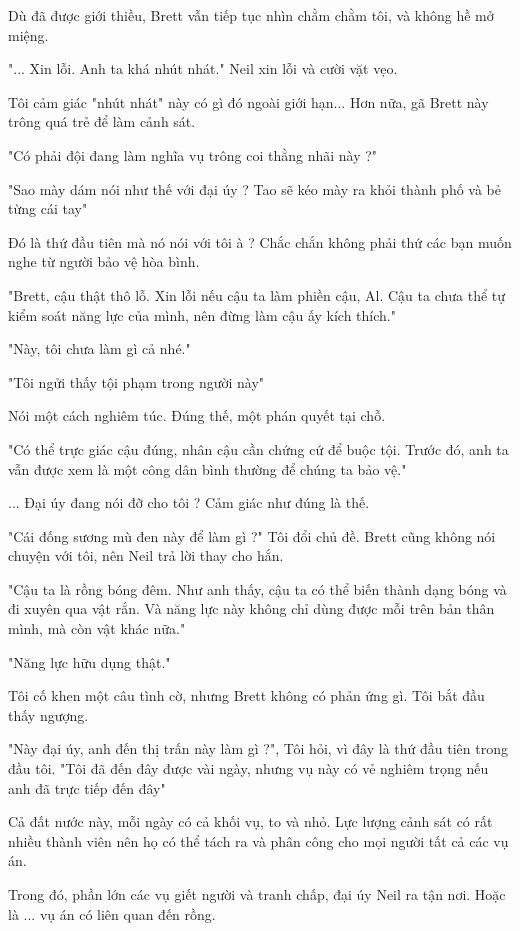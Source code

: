 Dù đã được giới thiều, Brett vẫn tiếp tục nhìn chằm chằm tôi, và không hề mở miệng.

"... Xin lỗi. Anh ta khá nhút nhát." Neil xin lỗi và cười vặt vẹo.

Tôi cảm giác "nhút nhát" này có gì đó ngoài giới hạn... Hơn nữa, gã Brett này trông quá trẻ để làm cảnh sát.

"Có phải đội đang làm nghĩa vụ trông coi thằng nhãi này ?"

"Sao mày dám nói như thế với đại úy ? Tao sẽ kéo mày ra khỏi thành phố và bẻ từng cái tay"

Đó là thứ đầu tiên mà nó nói với tôi à ? Chắc chắn không phải thứ các bạn muốn nghe từ người bảo vệ hòa bình.

"Brett, cậu thật thô lỗ. Xin lỗi nếu cậu ta làm phiền cậu, Al. Cậu ta chưa thể tự kiểm soát năng lực của mình, nên đừng làm cậu ấy kích thích."

"Này, tôi chưa làm gì cả nhé."

"Tôi ngửi thấy tội phạm trong người này"

Nói một cách nghiêm túc. Đúng thế, một phán quyết tại chỗ.

"Có thể trực giác cậu đúng, nhân cậu cần chứng cứ để buộc tội. Trước đó, anh ta vẫn được xem là một công dân bình thường để chúng ta bảo vệ."

... Đại úy đang nói đỡ cho tôi ? Cảm giác như đúng là thế.

"Cái đống sương mù đen này để làm gì ?" Tôi đổi chủ đề. Brett cũng không nói chuyện với tôi, nên Neil trả lời thay cho hắn.

"Cậu ta là rồng bóng đêm. Như anh thấy, cậu ta có thể biến thành dạng bóng và đi xuyên qua vật rắn. Và năng lực này không chỉ dùng được mỗi trên bản thân mình, mà còn vật khác nữa."

"Năng lực hữu dụng thật."

Tôi cố khen một câu tình cờ, nhưng Brett không có phản ứng gì. Tôi bắt đầu thấy ngượng.

"Này đại úy, anh đến thị trấn này làm gì ?", Tôi hỏi, vì đây là thứ đầu tiên trong đầu tôi. "Tôi đã đến đây được vài ngày, nhưng vụ này có vẻ nghiêm trọng nếu anh đã trực tiếp đến đây"

Cả đất nước này, mỗi ngày có cả khối vụ, to và nhỏ. Lực lượng cảnh sát có rất nhiều thành viên nên họ có thể tách ra và phân công cho mọi người tất cả các vụ án.

Trong đó, phần lớn các vụ giết người và tranh chấp, đại úy Neil ra tận nơi. Hoặc là ... vụ án có liên quan đến rồng. 

